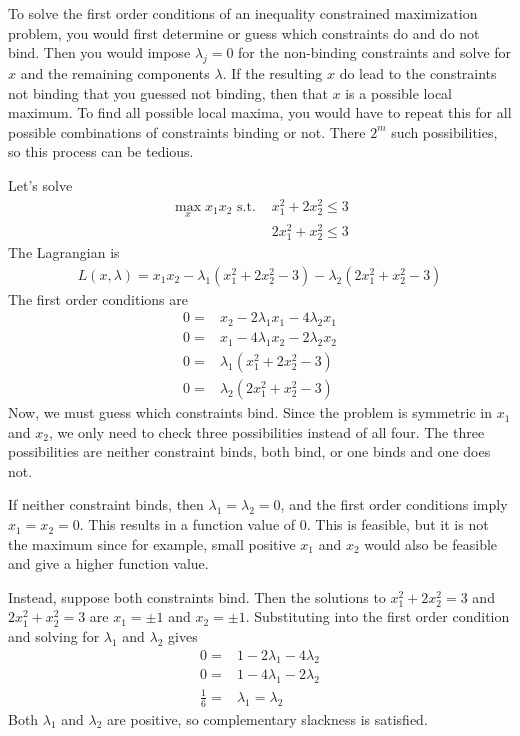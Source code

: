 To solve the first order conditions of an inequality constrained
maximization problem, you would first determine or guess which
constraints do and do not bind. Then you would impose $\lambda_j = 0$
for the non-binding constraints and solve for $x$ and the remaining
components $\lambda$. If the resulting $x$ do lead to the constraints
not binding that you guessed not binding, then that $x$ is a possible
local maximum. To find all possible local maxima, you would have to
repeat this for all possible combinations of constraints binding or
not. There $2^m$ such possibilities, so this process can be tedious.
\begin{example}
  Let's solve
  \begin{align*}
    \max_x x_1 x_2 \text{ s.t. } & x_1^2 + 2x_2^2 \leq 3 \\
    & 2 x_1^2 + x_2^2 \leq  3
  \end{align*}
  The Lagrangian is
  \begin{align*}
    L(x,\lambda) = x_1x_2 - \lambda_1(x_1^2 + 2x_2^2 - 3) -
    \lambda_2(2 x_1^2 + x_2^2 - 3) 
  \end{align*}
  The first order conditions are
  \begin{align*}
    0 = & x_2 - 2\lambda_1 x_1 - 4\lambda_2 x_1 \\
    0 = & x_1 - 4\lambda_1 x_2 - 2\lambda_2 x_2  \\
    0 = & \lambda_1(x_1^2 + 2x_2^2 - 3) \\
    0 = & \lambda_2(2 x_1^2 + x_2^2 - 3) 
  \end{align*}
  Now, we must guess which constraints bind. Since the problem is
  symmetric in $x_1$ and $x_2$, we only need to check three
  possibilities instead of all four. The three possibilities are
  neither constraint binds, both bind, or one binds and one does not. 

  If neither constraint binds, then $\lambda_1 = \lambda_2 = 0$, and
  the first order conditions imply $x_1 = x_2 = 0$. This results in a
  function value of $0$. This is feasible, but it is not the maximum
  since for example, small positive $x_1$ and $x_2$ would also be
  feasible and give a higher function value.

  Instead, suppose both constraints bind. Then the solutions to 
  $x_1^2 + 2x_2^2 = 3$ and $2 x_1^2 + x_2^2 = 3$ are $x_1 = \pm 1$ and
  $x_2 = \pm 1$. Substituting into the first order condition and
  solving for $\lambda_1$ and $\lambda_2$ gives
  \begin{align*} 
    0 = & 1 - 2 \lambda_1 - 4\lambda_2 \\
    0 = & 1 - 4 \lambda_1 - 2\lambda_2 \\
    \frac{1}{6} = & \lambda_1 = \lambda_2
  \end{align*}
  Both $\lambda_1$ and $\lambda_2$ are positive, so complementary
  slackness is satisfied.


\end{example}
